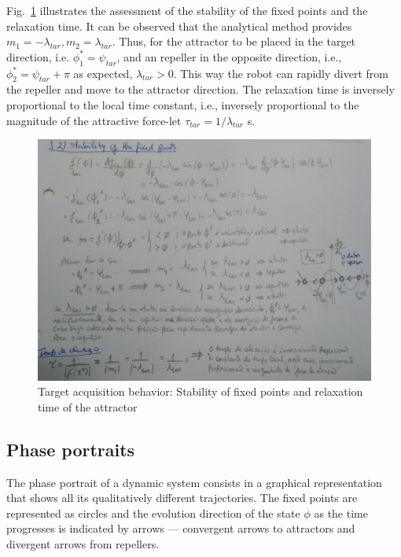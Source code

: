 Fig.~\ref{fig:1-2-stability-fixed-points} illustrates the assessment of the
stability of the fixed points and the relaxation time. It can be observed that
the analytical method provides $m_1 = - \lambda_{tar}, m_2 = \lambda_{tar}$.
Thus, for the attractor to be placed in the target direction, i.e. $\phi_1^* =
\psi_{tar}$, and an repeller in the opposite direction, i.e., $\phi_2^* =
\psi_{tar} + \pi$ as expected, $\lambda_{tar} > 0$.
This way the robot can rapidly divert from the repeller and move to the
attractor direction. The relaxation time is inversely proportional to the local
time constant, i.e., inversely proportional to the magnitude of the attractive
force-let $\tau_{tar} = 1/\lambda_{tar}$ s.
%
\begin{figure}[!hbt]
\centering
    \includegraphics[width=1.0\textwidth]{./img/1-2-stability-fixed-points.jpg}
  \caption{Target acquisition behavior: Stability of fixed points and relaxation time of the attractor}%
\label{fig:1-2-stability-fixed-points}
\end{figure}
%
\subsection{Phase portraits}%
\label{sec:phase-portraits}
The phase portrait of a dynamic system consists in a graphical representation
that shows all its qualitatively different trajectories. The fixed points are
represented as circles and the evolution direction of the state $\phi$ as the
time progresses is indicated by arrows --- convergent arrows to attractors and
divergent arrows from repellers.

